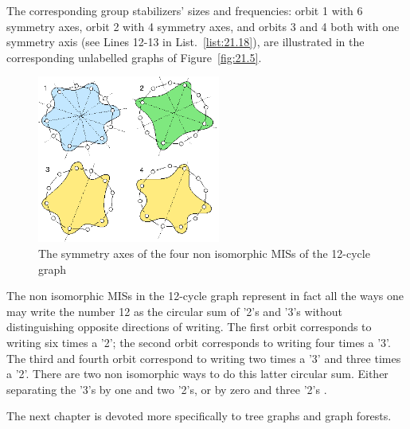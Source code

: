 The corresponding group stabilizers' sizes and frequencies: orbit 1 with 6 symmetry axes, orbit 2 with 4 symmetry axes, and orbits 3 and 4 both with one symmetry axis (see Lines 12-13 in List.~\vref{list:21.18}), are illustrated in the corresponding unlabelled graphs of Figure~\vref{fig:21.5}.
\begin{figure}[ht]
\sidecaption[t]
\includegraphics[width=6cm]{Figures/21-5-c12.png}
\caption{The symmetry axes of the four non isomorphic MISs of the 12-cycle graph} 
\label{fig:21.5}       %
\end{figure}

The non isomorphic MISs in the 12-cycle graph represent in fact all the ways one may write the number 12 as the circular sum of '2's and '3's without distinguishing opposite directions of writing. The first orbit corresponds to writing six times a '2'; the second orbit corresponds to writing four times a '3'. The third and fourth orbit correspond to writing two times a '3' and three times a '2'. There are two non isomorphic ways to do this latter circular sum. Either separating the '3's by one and two '2's, or by zero and three '2's \citep{ISO-2008}.

\vspace{1cm}

\noindent The next chapter is devoted more specifically to tree graphs and graph forests.

\clearpage

\typeout{}

%